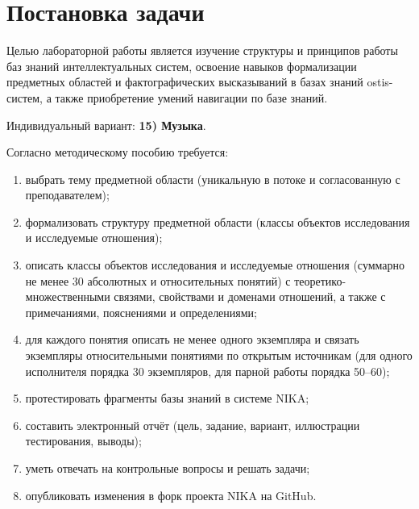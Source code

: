 \section{Постановка задачи}
\label{sec:task}

Целью лабораторной работы является изучение структуры и принципов работы баз знаний интеллектуальных систем, освоение навыков формализации предметных областей и фактографических высказываний в базах знаний ostis-систем, а также приобретение умений навигации по базе знаний.

Индивидуальный вариант: \textbf{15) Музыка}.

Согласно методическому пособию требуется:
\begin{enumerate}
	\item выбрать тему предметной области (уникальную в потоке и согласованную с преподавателем);
	\item формализовать структуру предметной области (классы объектов исследования и исследуемые отношения);
	\item описать классы объектов исследования и исследуемые отношения (суммарно не менее 30 абсолютных и относительных понятий) с теоретико-множественными связями, свойствами и доменами отношений, а также с примечаниями, пояснениями и определениями;
	\item для каждого понятия описать не менее одного экземпляра и связать экземпляры относительными понятиями по открытым источникам (для одного исполнителя \mdash порядка 30 экземпляров, для парной работы \mdash порядка 50--60);
	\item протестировать фрагменты базы знаний в системе NIKA;
	\item составить электронный отчёт (цель, задание, вариант, иллюстрации тестирования, выводы);
	\item уметь отвечать на контрольные вопросы и решать задачи;
	\item опубликовать изменения в форк проекта NIKA на GitHub.
\end{enumerate}
